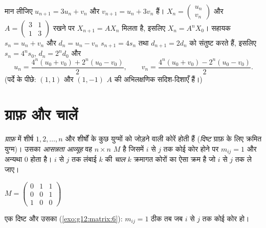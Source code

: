 \begin{example}[युग्मित अनुक्रम]\label{ex:g12:matrix:coupled}
मान लीजिए $u_{n+1} = 3u_n + v_n$ और $v_{n+1} = u_n + 3v_n$ हैं। $X_n = \begin{pmatrix} u_n\\ v_n \end{pmatrix}$ और $A = \begin{pmatrix} 3 & 1\\ 1 & 3\end{pmatrix}$ रखने पर $X_{n+1} = AX_n$ मिलता है, इसलिए $X_n = A^n X_0$।
सहायक  $s_n = u_n + v_n$ और $d_n = u_n - v_n$ $s_{n+1} = 4s_n$ तथा $d_{n+1} = 2d_n$ को संतुष्ट करते हैं, इसलिए $s_n = 4^n s_0$,
$d_n = 2^n d_0$ और
\[
u_n = \frac{4^n(u_0+v_0) + 2^n(u_0-v_0)}{2}, \qquad
v_n = \frac{4^n(u_0+v_0) - 2^n(u_0-v_0)}{2}.
\]
(पर्दे के पीछे: $(1,1)$ और $(1,-1)$ $A$ की अभिलक्षणिक सदिश-दिशाएँ हैं।)
\end{example}

\section{ग्राफ़ और चालें}

\begin{definition}[ग्राफ़, आसन्नता आव्यूह]\label{def:g12:matrix:graph}
\emph{ग्राफ़} में शीर्ष $1, 2, \dots, n$ और शीर्षों के कुछ युग्मों को
जोड़ने वाली कोरें होती हैं (\emph{दिष्ट} ग्राफ़ के लिए क्रमित युग्म)। उसका
\emph{आसन्नता आव्यूह} वह $n \times n$  $M$ है जिसमें
$i$ से $j$ तक कोई कोर होने पर $m_{ij} = 1$ और अन्यथा $0$ होता है। $i$ से
$j$ तक लंबाई $k$ की \emph{चाल} $k$ क्रमागत कोरों का ऐसा क्रम है जो $i$
से $j$ तक ले जाए।
\end{definition}

\begin{omfigure}
\qquad\qquad
$M = \begin{pmatrix} 0 & 1 & 1\\ 0 & 0 & 1\\ 1 & 0 & 0 \end{pmatrix}$

{\small एक दिष्ट  और उसका  (\cref{exo:g12:matrix:6}): $m_{ij} = 1$ ठीक तब जब $i$
से $j$ तक कोई कोर हो।}
\end{omfigure}

